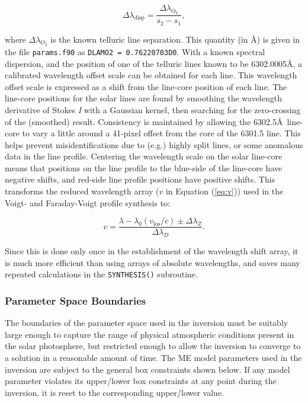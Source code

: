 \documentclass[11pt]{article}
\begin{document}
\begin{equation}
\Delta\lambda_{\mathrm{disp}} = \frac{\Delta\lambda_{\mathrm{O_{2}}}}{s_{2}-s_{1}},
\end{equation}

where $\Delta\lambda_{O_{2}}$ is the known telluric line separation.  This quantity (in \AA)
is given in the file \texttt{params.f90} as \texttt{DLAMO2 = 0.76220703D0}.  With a 
known spectral dispersion, and the position of one of the telluric lines known to be
6302.0005\AA, a calibrated wavelength offset scale can be obtained for each line.  This wavelength
offset scale is expressed as a shift from the line-core position of each line.  The line-core positions for the
solar lines are found by smoothing the wavelength derivative of Stokes \textit{I} with a Gaussian
kernel, then searching for the zero-crossing of the (smoothed) result.  Consistency is maintained
by allowing the 6302.5\AA\ line-core to vary a little around a 41-pixel offset from the core
of the 6301.5 line.  This helps prevent misidentifications due to (e.g.) highly split lines, or 
some anomalous data in the line profile.  Centering the wavelength scale on the solar line-core
means that positions on the line profile to the blue-side of the line-core have negative shifts, and
red-side line profile positions have positive shifts.  This transforms the reduced wavelength
array ($v$ in Equation (\ref{eq:v})) used in the Voigt- and Faraday-Voigt profile synthesis to:

\begin{equation}
v = \frac{\lambda-\lambda_{0}(v_{\mathrm{los}}/c) \pm \Delta\lambda_{Z}}{\Delta\lambda_{D}}.
\end{equation}

Since this is done only once in the establishment of the wavelength shift array, it is much
more efficient than using arrays of absolute wavelengths, and saves many repeated
calculations in the \texttt{SYNTHESIS()} subroutine.


\subsubsection{Parameter Space Boundaries}\label{ss:bounds}
The boundaries of the parameter space used in the inversion must be suitably large
enough to capture the range of physical atmospheric conditions present in the solar
photosphere, but restricted enough to allow the inversion to converge to a solution
in a reasonable amount of time.  The ME model parameters used in the inversion are
subject to the general box constraints shown below.  If any model parameter violates
its upper/lower box constraints at any point during the inversion, it is reset to the
corresponding upper/lower value.
\end{document}

